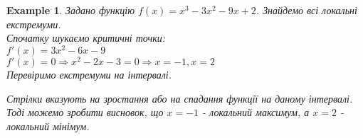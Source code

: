 \documentclass[a4paper, 14pt]{article}
\theoremstyle{theoremdd}
\theoremstyle{theoremdd}
\theoremstyle{theoremdd}
\theoremstyle{theoremdd}
\newtheorem{example}[theorem]{Example}
\theoremstyle{theoremdd}
\theoremstyle{theoremdd}
\theoremstyle{theoremdd}
\theoremstyle{theoremdd}
\begin{document}
\begin{example}
Задано функцію $f(x) = x^3-3x^2-9x+2$. Знайдемо всі локальні екстремуми.\\
Спочатку шукаємо критичні точки:\\
$f'(x) = 3x^2-6x-9$\\
$f'(x) = 0 \Rightarrow x^2-2x-3 = 0 \Rightarrow x = -1,x = 2$\\
Перевіримо екстремуми на інтервалі.
\begin{figure}[H]
\centering
{}
\end{figure}
Стрілки вказують на зростання або на спадання функції на даному інтервалі. Тоді можемо зробити висновок, що $x=-1$ - локальний максимум, а $x=2$ - локальний мінімум.
\end{example}
\end{document}
